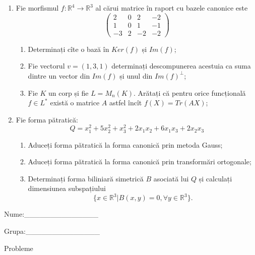 \documentclass{article}
\begin{document}
\begin{enumerate}
 \item Fie morfismul $f:\mathbb{R}^4 \to \mathbb{R}^3$ al cărui matrice în raport cu bazele canonice este
$$\begin{pmatrix}
2&0&2&-2\\
1&0&1&-1\\
-3&2&-2&-2
\end{pmatrix}$$

\begin{enumerate}
\item Determinați cîte o bază în $Ker(f)$ și $Im(f)$;
\item Fie vectorul $v=(1,3,1)$ determinați descompunerea acestuia ca suma dintre un vector din $Im(f)$ și unul din $Im(f)^\perp$;
\item Fie $K$ un corp și fie $L=M_n(K)$. Arătați că pentru orice funcțională $f \in L^*$ există o matrice $A$ astfel încît $f(X)=Tr(AX)$;
\end{enumerate}
\item Fie forma pătratică:
$$Q= x_1^2+5x_2^2+x_3^2+2x_1x_2+6x_1x_3+2x_2x_3$$

\begin{enumerate}
\item Aduceți forma pătratică la forma canonică prin metoda Gauss;
\item Aduceți forma pătratică la forma canonică prin transformări ortogonale;
\item Determinați forma biliniară simetrică $B$ asociată lui $Q$ și calculați dimensiunea subspațiului
$$\{x \in \mathbb{R}^3 | B(x,y)=0,\forall y \in \mathbb{R}^3\}.$$

\end{enumerate}
\end{enumerate}
\newpage
\begin{flushright}
Nume:\_\_\_\_\_\_\_\_\_\_\_\_\_\_
 
 
Grupa:\_\_\_\_\_\_\_\_\_\_\_\_\_\_
\end{flushright}
\begin{center}
\vspace{2cm}
{\Large Probleme}
\vspace{2cm}
\end{center}
\end{document}
